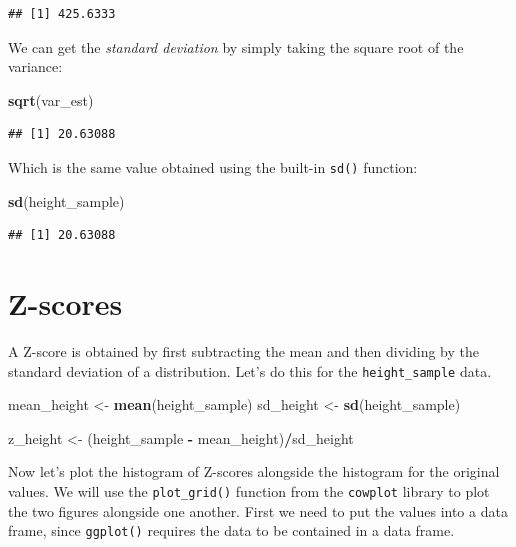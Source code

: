 \documentclass[
  12pt,
]{book}
\newenvironment{Shaded}{\begin{snugshade}}{\end{snugshade}}
\newcommand{\FunctionTok}[1]{\textcolor[rgb]{0.13,0.29,0.53}{\textbf{#1}}}
\newcommand{\NormalTok}[1]{#1}
\newcommand{\OtherTok}[1]{\textcolor[rgb]{0.56,0.35,0.01}{#1}}
\newcommand{\SpecialCharTok}[1]{\textcolor[rgb]{0.81,0.36,0.00}{\textbf{#1}}}
\begin{document}
\begin{verbatim}
## [1] 425.6333
\end{verbatim}

We can get the \emph{standard deviation} by simply taking the square root of the variance:

\begin{Shaded}
\begin{Highlighting}[]
\FunctionTok{sqrt}\NormalTok{(var\_est)}
\end{Highlighting}
\end{Shaded}

\begin{verbatim}
## [1] 20.63088
\end{verbatim}

Which is the same value obtained using the built-in \texttt{sd()} function:

\begin{Shaded}
\begin{Highlighting}[]
\FunctionTok{sd}\NormalTok{(height\_sample)}
\end{Highlighting}
\end{Shaded}

\begin{verbatim}
## [1] 20.63088
\end{verbatim}

\hypertarget{z-scores}{%
\section{Z-scores}\label{z-scores}}

A Z-score is obtained by first subtracting the mean and then dividing by the standard deviation of a distribution. Let's do this for the \texttt{height\_sample} data.

\begin{Shaded}
\begin{Highlighting}[]
\NormalTok{mean\_height }\OtherTok{\textless{}{-}} \FunctionTok{mean}\NormalTok{(height\_sample)}
\NormalTok{sd\_height }\OtherTok{\textless{}{-}} \FunctionTok{sd}\NormalTok{(height\_sample)}

\NormalTok{z\_height }\OtherTok{\textless{}{-}}\NormalTok{ (height\_sample }\SpecialCharTok{{-}}\NormalTok{ mean\_height)}\SpecialCharTok{/}\NormalTok{sd\_height}
\end{Highlighting}
\end{Shaded}

Now let's plot the histogram of Z-scores alongside the histogram for the original values. We will use the \texttt{plot\_grid()} function from the \texttt{cowplot} library to plot the two figures alongside one another. First we need to put the values into a data frame, since \texttt{ggplot()} requires the data to be contained in a data frame.
\end{document}
